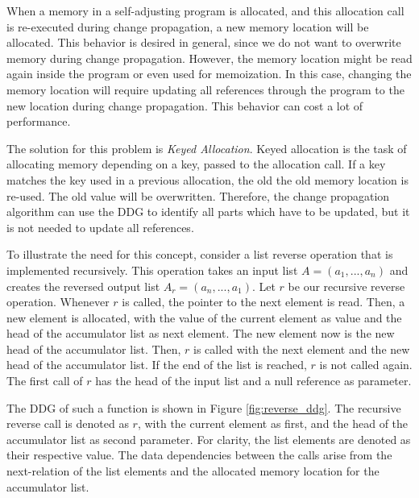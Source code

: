 When a memory in a self-adjusting program is allocated, and this allocation call is re-executed during change propagation, a new memory location will be allocated. This behavior is desired in general, since we do not want to overwrite memory during change propagation. However, the memory location might be read again inside the program or even used for memoization. In this case, changing the memory location will require updating all references through the program to the new location during change propagation. This behavior can cost a lot of performance. 

The solution for this problem is \textit{Keyed Allocation}. Keyed allocation is the task of allocating memory depending on a key, passed to the allocation call. If a key matches the key used in a previous allocation, the old the old memory location is re-used. The old value will be overwritten. Therefore, the change propagation algorithm can use the DDG to identify all parts which have to be updated, but it is not needed to update all references. 

To illustrate the need for this concept, consider a list reverse operation that is implemented recursively. This operation takes an input list $A = (a_1, ..., a_n)$ and creates the reversed output list $A_r = (a_n, ..., a_1)$. Let $r$ be our recursive reverse operation. Whenever $r$ is called, the pointer to the next element is read. Then, a new element is allocated, with the value of the current element as value and the head of the accumulator list as next element. The new element now is the new head of the accumulator list. Then, $r$ is called with the next element and the new head of the accumulator list. If the end of the list is reached, $r$ is not called again. The first call of $r$ has the head of the input list and a null reference as parameter. 

The DDG of such a function is shown in Figure \ref{fig:reverse_ddg}. The recursive reverse call is denoted as $r$, with the current element as first, and the head of the accumulator list as second parameter. For clarity, the list elements are denoted as their respective value. The data dependencies between the calls arise from the next-relation of the list elements and the allocated memory location for the accumulator list. 


